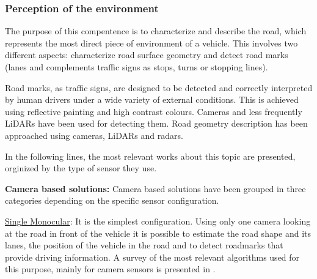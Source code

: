 \subsubsection{Perception of the environment}
The purpose of this compentence is to characterize and describe the road, which
represents the most direct piece of environment of a vehicle. This 
involves two different aspects: characterize road surface geometry and detect road marks (lanes
and complements traffic signs as stops, turns or stopping lines).



Road marks, as traffic signs, are designed to be detected and 
correctly interpreted by human drivers under a wide variety of external 
conditions. This is achieved using reflective painting and high contrast 
colours. Cameras and less frequently LiDARs have been used for detecting them.
Road geometry description has been approached using cameras, LiDARs and radars.

In the following lines, the most relevant works about this topic are presented, orginized by the type of sensor they use.


\textbf{Camera based solutions:}
Camera based solutions have been grouped in three categories depending on the
specific sensor configuration.

\underline{Single Monocular}:
It is the simplest configuration. Using only one 
camera looking at the road in front of the vehicle it is possible to estimate 
the road shape and its lanes, the position of the vehicle in the road and to 
detect roadmarks  that provide driving information. A survey of the most 
relevant algorithms used for this purpose, mainly for camera sensors is 
presented in \cite{hillel2014recent}.

